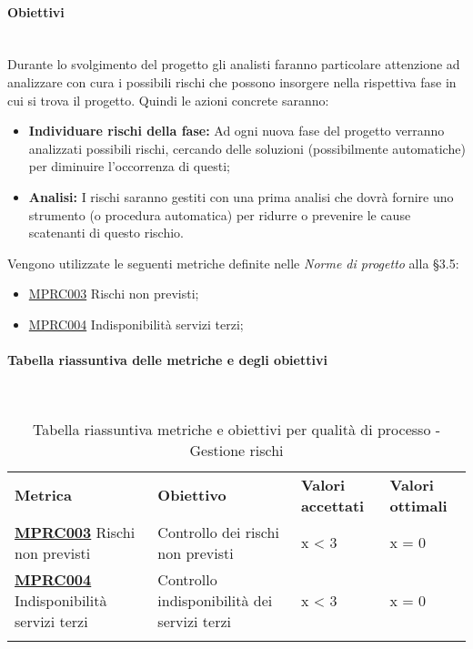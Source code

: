 \paragraph{Obiettivi}\mbox{}\\[0.4cm]
Durante lo svolgimento del progetto gli analisti faranno particolare attenzione ad analizzare con cura i possibili rischi che possono insorgere nella rispettiva fase in cui si trova il progetto. 
Quindi le azioni concrete saranno:
\begin{itemize}
	\item \textbf{Individuare rischi della fase:} Ad ogni nuova fase del progetto verranno analizzati possibili rischi, cercando delle soluzioni (possibilmente automatiche) per diminuire l’occorrenza di questi;
	\item \textbf{Analisi:} I rischi saranno gestiti con una prima analisi che dovrà fornire uno strumento (o procedura automatica) per ridurre o prevenire le cause scatenanti di questo rischio.
\end{itemize}
Vengono utilizzate le seguenti metriche definite nelle \textit{Norme di progetto} alla §3.5:
\begin{itemize}
	\item \label{metrica_processo_MPRC003}\hyperref[metrica_processo_ob_MPRC003]{MPRC003} Rischi non previsti;
	\item \label{metrica_processo_MPRC004}\hyperref[metrica_processo_ob_MPRC004]{MPRC004} Indisponibilità servizi terzi;
\end{itemize}
\clearpage
\paragraph{Tabella riassuntiva delle metriche e degli obiettivi}\mbox{}\\[0.3cm]
\begin{center}
\renewcommand{\arraystretch}{1.5}
	\begin{longtable}{  >{\RaggedRight}p{2.8cm}  >{\RaggedRight}p{5cm} >{\RaggedRight}p{2.5cm}  >{\RaggedRight}p{2.5cm}  }
		\rowcolor{tableHeadYellow}
		\textbf{Metrica}   & \textbf{Obiettivo} & \textbf{Valori \mbox{accettati}} & \textbf{Valori \mbox{ottimali}}\\
		\textbf{\label{metrica_processo_ob_MPRC003}\hyperref[metrica_processo_MPRC003]{MPRC003}} Rischi non previsti & Controllo dei rischi non previsti &  x < 3 &  x = 0  \\
		\textbf{\label{metrica_processo_ob_MPRC004}\hyperref[metrica_processo_MPRC004]{MPRC004}} \mbox{Indisponibilità} servizi terzi & Controllo indisponibilità dei servizi terzi & x < 3 & x = 0 \\
		\rowcolor{white}
		\caption{Tabella riassuntiva metriche e obiettivi per qualità di processo - Gestione rischi}
	\end{longtable}
\end{center}